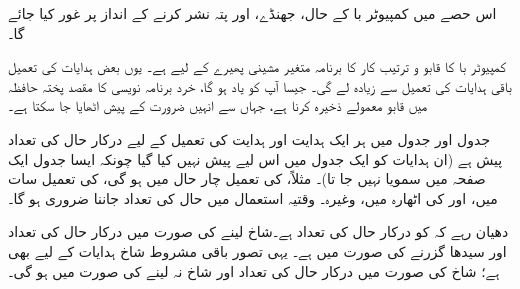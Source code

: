 اس حصے میں کمپیوٹر با کے  حال، جھنڈے، اور  پتہ نشر کرنے کے انداز پر غور کیا جائے گا۔

کمپیوٹر با کا قابو و ترتیب کار کا برنامہ  متغیر مشینی پھیرے کے لیے   ہے۔ یوں بعض ہدایات کی تعمیل باقی ہدایات کی تعمیل سے  زیادہ  لے گی۔ جیسا آپ کو یاد ہو گا، خرد برنامہ نویسی کا مقصد پختہ حافظہ میں قابو  معمولے ذخیرہ کرنا ہے، جہاں سے انہیں ضرورت کے پیش  اٹھایا جا سکتا ہے۔

جدول   اور جدول   میں  ہر ایک ہدایت  اور ہدایت کی تعمیل کے لیے درکار  حال کی تعداد پیش ہے (ان ہدایات کو ایک جدول میں اس لیے پیش نہیں کیا گیا چونکہ ایسا  جدول ایک صفحہ میں سمویا نہیں جا تا)۔ مثلاً، \ADD{\regB} کی تعمیل چار  حال میں ہو گی،  کی تعمیل  سات میں،  اور \sCALL کی اٹھارہ میں، وغیرہ۔ وقتیہ استعمال میں  حال کی تعداد جاننا ضروری ہو گا۔

دھیان رہے کہ \sJM کو  درکار  حال  کی تعداد  ہے۔شاخ لینے کی صورت میں درکار   حال کی تعداد  اور سیدھا گزرنے کی صورت میں  ہے۔ یہی تصور باقی مشروط شاخ ہدایات کے لیے بھی  ہے؛ شاخ  کی صورت میں درکار  حال کی تعداد    اور شاخ نہ لینے کی صورت میں  ہو گی۔

